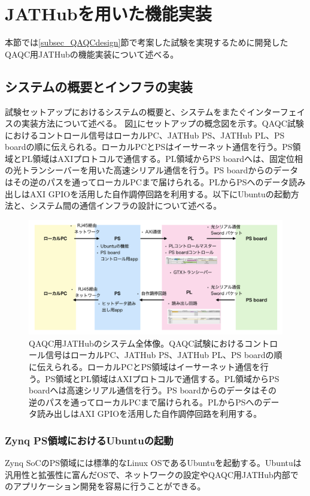 \section{JATHubを用いた機能実装}
\label{sec_QAQC_JATHub}
本節では\ref{subsec_QAQCdesign}節で考案した試験を実現するために開発したQAQC用JATHubの機能実装について述べる。

\subsection{システムの概要とインフラの実装}
\label{subsec_infra}
試験セットアップにおけるシステムの概要と、システムをまたぐインターフェイスの実装方法について述べる。
図\ref{JAThubinfra}にセットアップの概念図を示す。QAQC試験におけるコントロール信号はローカルPC、JATHub PS、JATHub PL、PS boardの順に伝えられる。ローカルPCとPSはイーサーネット通信を行う。PS領域とPL領域はAXIプロトコルで通信する。PL領域からPS boardへは、固定位相の光トランシーバーを用いた高速シリアル通信を行う。PS boardからのデータはその逆のパスを通ってローカルPCまで届けられる。PLからPSへのデータ読み出しはAXI GPIOを活用した自作調停回路を利用する。以下にUbuntuの起動方法と、システム間の通信インフラの設計について述べる。

\begin{figure} 
\centering
\includegraphics[width=16cm]{fig/QAQC/JAThubinfra.png}
\caption[QAQC用JATHubのシステム全体像]{QAQC用JATHubのシステム全体像。QAQC試験におけるコントロール信号はローカルPC、JATHub PS、JATHub PL、PS boardの順に伝えられる。ローカルPCとPS領域はイーサーネット通信を行う。PS領域とPL領域はAXIプロトコルで通信する。PL領域からPS boardへは高速シリアル通信を行う。PS boardからのデータはその逆のパスを通ってローカルPCまで届けられる。PLからPSへのデータ読み出しはAXI GPIOを活用した自作調停回路を利用する。}
\label{JAThubinfra}
\end{figure}

\subsubsection{Zynq PS領域におけるUbuntuの起動}
\label{subsubsec_ubuntu}
\baselineskip
Zynq SoCのPS領域には標準的なLinux OSであるUbuntuを起動する。Ubuntuは汎用性と拡張性に富んだOSで、ネットワークの設定やQAQC用JATHub内部でのアプリケーション開発を容易に行うことができる。\par

